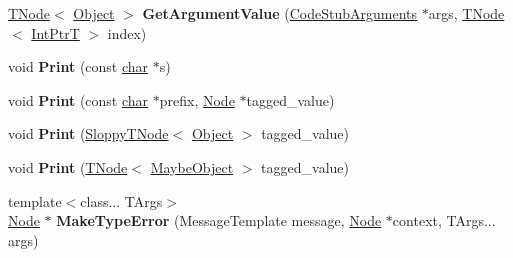 \begin{DoxyCompactItemize}
\mbox{\hyperlink{classv8_1_1internal_1_1compiler_1_1TNode}{T\+Node}}$<$ \mbox{\hyperlink{classv8_1_1internal_1_1Object}{Object}} $>$ {\bfseries Get\+Argument\+Value} (\mbox{\hyperlink{classv8_1_1internal_1_1CodeStubArguments}{Code\+Stub\+Arguments}} $\ast$args, \mbox{\hyperlink{classv8_1_1internal_1_1compiler_1_1TNode}{T\+Node}}$<$ \mbox{\hyperlink{structv8_1_1internal_1_1IntPtrT}{Int\+PtrT}} $>$ index)
\item 
\mbox{\label{classv8_1_1internal_1_1CodeStubAssembler_a1fa98e650325d1874898e58809a45a7d}} 
void {\bfseries Print} (const \mbox{\hyperlink{classchar}{char}} $\ast$s)
\item 
\mbox{\label{classv8_1_1internal_1_1CodeStubAssembler_a25d298d2d0564c88a395315722af55f1}} 
void {\bfseries Print} (const \mbox{\hyperlink{classchar}{char}} $\ast$prefix, \mbox{\hyperlink{classv8_1_1internal_1_1compiler_1_1Node}{Node}} $\ast$tagged\+\_\+value)
\item 
\mbox{\label{classv8_1_1internal_1_1CodeStubAssembler_a1363d2f6c0b67f03f96207b379cc532e}} 
void {\bfseries Print} (\mbox{\hyperlink{classv8_1_1internal_1_1compiler_1_1SloppyTNode}{Sloppy\+T\+Node}}$<$ \mbox{\hyperlink{classv8_1_1internal_1_1Object}{Object}} $>$ tagged\+\_\+value)
\item 
\mbox{\label{classv8_1_1internal_1_1CodeStubAssembler_a1465d8ee658c3d617d4daa2af55ccac1}} 
void {\bfseries Print} (\mbox{\hyperlink{classv8_1_1internal_1_1compiler_1_1TNode}{T\+Node}}$<$ \mbox{\hyperlink{classv8_1_1internal_1_1MaybeObject}{Maybe\+Object}} $>$ tagged\+\_\+value)
\item 
\mbox{\label{classv8_1_1internal_1_1CodeStubAssembler_aef28b79668d9efb9b063c9be30eac47b}} 
{\footnotesize template$<$class... T\+Args$>$ }\\\mbox{\hyperlink{classv8_1_1internal_1_1compiler_1_1Node}{Node}} $\ast$ {\bfseries Make\+Type\+Error} (Message\+Template message, \mbox{\hyperlink{classv8_1_1internal_1_1compiler_1_1Node}{Node}} $\ast$context, T\+Args... args)
\item 
\mbox{\label{classv8_1_1internal_1_1CodeStubAssembler_adb42f68829df7847a52f528ab5d8e044}} 

\end{DoxyCompactItemize}

